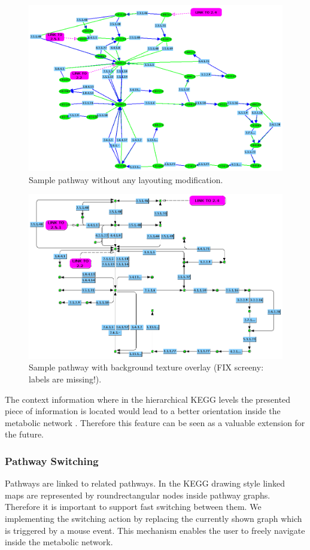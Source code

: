 \begin{figure}[ht]
  \centering
    \includegraphics[width=0.7\linewidth]{gfx/sample_pathway_jgraph}
  \caption{Sample pathway without any layouting modification.}
  \label{fig:sample_pathway_jgraph}
\end{figure}

\begin{figure}[ht]
  \centering
    \includegraphics[width=0.7\linewidth]{gfx/sample_pathway_jgraph_background}
  \caption{Sample pathway with background texture overlay (FIX screeny: labels are missing!).}
  \label{fig:sample_pathway_jgraph_background}
\end{figure}

The context information where in the hierarchical KEGG levels the presented piece of information is located would lead to a better orientation inside the metabolic network \citep{Jourdan2003}. Therefore this feature can be seen as a valuable extension for the future. 

\subsubsection{Pathway Switching}

Pathways are linked to related pathways. In the KEGG drawing style linked maps are represented by roundrectangular nodes inside pathway graphs. Therefore it is important to support fast switching between them. We implementing the switching action by replacing the currently shown graph which is triggered by a mouse event. This mechanism enables the user to freely navigate inside the metabolic network.

